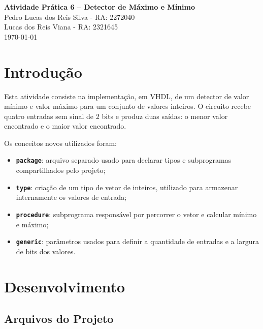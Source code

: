 \documentclass[12pt,a4paper, brazil]{article}
\begin{document}
\begin{center}
{\textbf {\huge Atividade Prática 6 -- Detector de Máximo e Mínimo}}\\[5mm]
{\large Pedro Lucas dos Reis Silva - RA: 2272040} \\[5mm]
{\large Lucas dos Reis Viana - RA: 2321645} \\[5mm]
\today\\[5mm]
\end{center}

\section{Introdução}

Esta atividade consiste na implementação, em VHDL, de um detector de valor mínimo e valor máximo para um conjunto de valores inteiros. O circuito recebe quatro entradas sem sinal de 2 bits e produz duas saídas: o menor valor encontrado e o maior valor encontrado.

Os conceitos novos utilizados foram:

\begin{itemize}
    \item \textbf{\texttt{package}}: arquivo separado usado para declarar tipos e subprogramas compartilhados pelo projeto;
    \item \textbf{\texttt{type}}: criação de um tipo de vetor de inteiros, utilizado para armazenar internamente os valores de entrada;
    \item \textbf{\texttt{procedure}}: subprograma responsável por percorrer o vetor e calcular mínimo e máximo;
    \item \textbf{\texttt{generic}}: parâmetros usados para definir a quantidade de entradas e a largura de bits dos valores.
\end{itemize}

\section{Desenvolvimento}

\subsection{Arquivos do Projeto}
\end{document}
